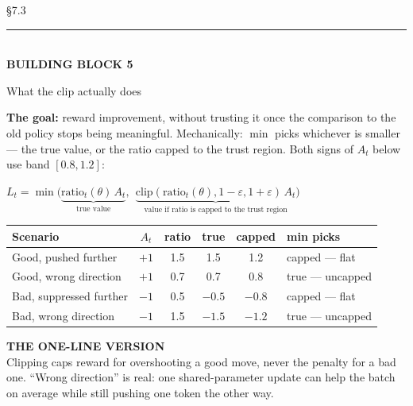 \documentclass[aspectratio=169,11pt]{beamer}
\newcommand{\eyebrow}[2]{%
  \noindent{\scriptsize\sffamily\color{inkdim}\MakeUppercase{#1}}\hfill{\scriptsize\ttfamily\color{accentB}#2}\\[3pt]
  {\color{linecol}\rule{\linewidth}{0.6pt}}\\[13pt]%
}
\newcommand{\headline}[1]{{\usefont{T1}{ppl}{b}{n}\selectfont\LARGE\color{ink} #1}\par\vspace{10pt}}
\newcommand{\frametag}[2]{{\small\sffamily\bfseries\color{#1}\MakeUppercase{#2}}\par\vspace{4pt}}
\newcommand{\clabel}[2]{{\small\sffamily\bfseries\color{#1}\MakeUppercase{#2}}\\[4pt]}
\begin{document}
\begin{frame}
\eyebrow{Baselines \& PPO \textperiodcentered\ 18}{\S7.3}
\frametag{inkdim}{Building block 5}
\vspace{-6pt}
\headline{What the clip actually does}
\vspace{-8pt}
{\footnotesize\color{ink}\textbf{The goal:} reward improvement, without trusting it once the comparison to the old policy stops being meaningful. Mechanically: $\min$ picks whichever is smaller --- the true value, or the ratio capped to the trust region. Both signs of $A_t$ below use band $[0.8,1.2]$:}
\par\vspace{1pt}
\begin{eqbox}[fontupper=\small,top=2pt,bottom=2pt]
$L_t = \min\Big(\underbrace{\text{ratio}_t(\theta)\,A_t}_{\text{true value}},\ \ \underbrace{\text{clip}(\text{ratio}_t(\theta),1{-}\varepsilon,1{+}\varepsilon)\,A_t}_{\text{value if ratio is capped to the trust region}}\Big)$
\end{eqbox}
\par\vspace{1pt}
\footnotesize
\renewcommand{\arraystretch}{0.8}
\begin{tabular}{@{} l c c c c l @{}}
\toprule
\textbf{Scenario} & \textbf{$A_t$} & \textbf{ratio} & \textbf{true} & \textbf{capped} & \textbf{min picks} \\
\midrule
Good, pushed further & $+1$ & 1.5 & 1.5 & 1.2 & \color{accent}capped --- flat \\
Good, wrong direction & $+1$ & 0.7 & 0.7 & 0.8 & \color{neg}true --- uncapped \\
Bad, suppressed further & $-1$ & 0.5 & $-0.5$ & $-0.8$ & \color{accent}capped --- flat \\
Bad, wrong direction & $-1$ & 1.5 & $-1.5$ & $-1.2$ & \color{neg}true --- uncapped \\
\bottomrule
\end{tabular}
\par\vspace{1pt}
\begin{callout}[top=2pt,bottom=2pt]
\clabel{accentB}{The one-line version}
{\footnotesize\color{ink}Clipping caps reward for overshooting a good move, never the penalty for a bad one. ``Wrong direction'' is real: one shared-parameter update can help the batch on average while still pushing one token the other way.}
\end{callout}
\end{frame}
\end{document}
